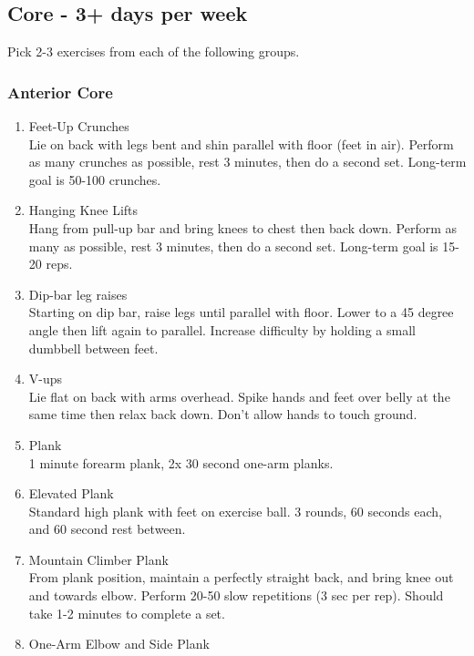 \documentclass[12pt, letterpaper]{article}
\begin{document}
\subsection{Core - 3+ days per week}

Pick 2-3 exercises from each of the following groups.

\subsubsection{Anterior Core}

\begin{enumerate}
    \item Feet-Up Crunches \\ 
          Lie on back with legs bent and shin parallel with floor (feet in air). Perform as many crunches as possible, 
          rest 3 minutes, then do a second set. Long-term goal is 50-100 crunches.
    \item Hanging Knee Lifts \\ 
          Hang from pull-up bar and bring knees to chest then back down. Perform as many as possible, rest 3 minutes, 
          then do a second set. Long-term goal is 15-20 reps.
    \item Dip-bar leg raises \\
          Starting on dip bar, raise legs until parallel with floor. Lower to a 45 degree angle then lift again to 
          parallel. Increase difficulty by holding a small dumbbell between feet. 
      \item V-ups\\
         Lie flat on back with arms overhead. Spike hands and feet over belly at the same time then relax back down.
         Don't allow hands to touch ground.
      \item Plank \\
          1 minute forearm plank, 2x 30 second one-arm planks.
    \item Elevated Plank \\
          Standard high plank with feet on exercise ball. 3 rounds, 60 seconds each, and 60 second rest between.
    \item Mountain Climber Plank \\ 
          From plank position, maintain a perfectly straight back, and bring knee out and towards elbow. 
          Perform 20-50 slow repetitions (3 sec per rep). 
          Should take 1-2 minutes to complete a set.
    \item One-Arm Elbow and Side Plank \\ 

\end{enumerate}
\end{document}
